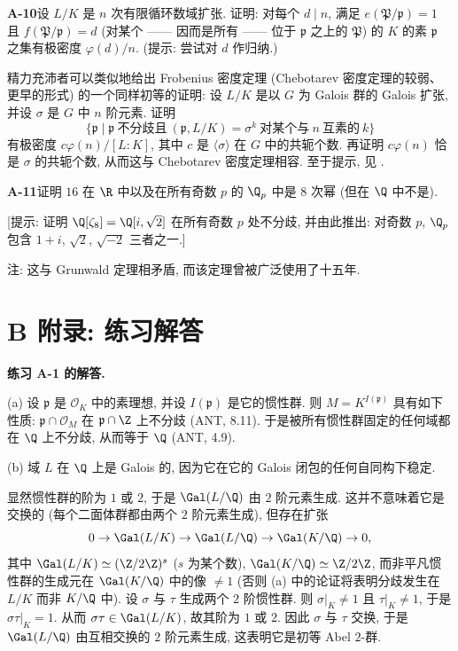 \medskip\noindent{}\hypertarget{item:viii.A-10}{}\textbf{A-10}\quad 设 $L/K$ 是 $n$ 次有限循环数域扩张. 证明: 对每个 $d\mid n$, 满足 $e(\mathfrak{P}/\mathfrak{p})=1$ 且 $f(\mathfrak{P}/\mathfrak{p})=d$ (对某个 —— 因而是所有 —— 位于 $\mathfrak{p}$ 之上的 $\mathfrak{P}$) 的 $K$ 的素 $\mathfrak{p}$ 之集有极密度 $\varphi(d)/n$. (提示: 尝试对 $d$ 作归纳.)

精力充沛者可以类似地给出 Frobenius 密度定理 (Chebotarev 密度定理的较弱、更早的形式) 的一个同样初等的证明: 设 $L/K$ 是以 $G$ 为 Galois 群的 Galois 扩张, 并设 $\sigma$ 是 $G$ 中 $n$ 阶元素. 证明
\[
\{\mathfrak{p}\mid \mathfrak{p}\ \text{不分歧且}\ (\mathfrak{p},L/K)=\sigma^{k}\ \text{对某个与}\ n\ \text{互素的}\ k\}
\]
有极密度 $c\varphi(n)/[L:K]$, 其中 $c$ 是 $\langle\sigma\rangle$ 在 $G$ 中的共轭个数. 再证明 $c\varphi(n)$ 恰是 $\sigma$ 的共轭个数, 从而这与 Chebotarev 密度定理相容. 至于提示, 见 \cite[pp.~207--208]{Marcus1977}.

\medskip\noindent\textbf{A-11}\quad 证明 $16$ 在 $\R$ 中以及在所有奇数 $p$ 的 $\Q_p$ 中是 $8$ 次幂 (但在 $\Q$ 中不是).

[提示: 证明 $\Q[\zeta_8]=\Q[i,\sqrt{2}]$ 在所有奇数 $p$ 处不分歧, 并由此推出: 对奇数 $p$, $\Q_p$ 包含 $1+i$, $\sqrt{2}$, $\sqrt{-2}$ 三者之一.]

注: 这与 Grunwald 定理相矛盾, 而该定理曾被广泛使用了十五年.

\cleardoublepage{}
\section*{B 附录: 练习解答}\label{sec:VIII.B}

\noindent\textbf{练习 A-1 的解答.}

(a) 设 $\mathfrak{p}$ 是 $\mathcal{O}_K$ 中的素理想, 并设 $I(\mathfrak{p})$ 是它的惯性群. 则 $M=K^{I(\mathfrak{p})}$ 具有如下性质: $\mathfrak{p}\cap\mathcal{O}_M$ 在 $\mathfrak{p}\cap\Z$ 上不分歧 (ANT, 8.11). 于是被所有惯性群固定的任何域都在 $\Q$ 上不分歧, 从而等于 $\Q$ (ANT, 4.9).

(b) 域 $L$ 在 $\Q$ 上是 Galois 的, 因为它在它的 Galois 闭包的任何自同构下稳定.

显然惯性群的阶为 $1$ 或 $2$, 于是 $\Gal(L/\Q)$ 由 $2$ 阶元素生成. 这并不意味着它是交换的 (每个二面体群都由两个 $2$ 阶元素生成), 但存在扩张
\[
0\to\Gal(L/K)\to\Gal(L/\Q)\to\Gal(K/\Q)\to 0,
\]
其中 $\Gal(L/K)\simeq(\Z/2\Z)^{s}$ ($s$ 为某个数), $\Gal(K/\Q)\simeq\Z/2\Z$, 而非平凡惯性群的生成元在 $\Gal(K/\Q)$ 中的像 $\ne 1$ (否则 (a) 中的论证将表明分歧发生在 $L/K$ 而非 $K/\Q$ 中). 设 $\sigma$ 与 $\tau$ 生成两个 $2$ 阶惯性群. 则 $\sigma|_K\ne1$ 且 $\tau|_K\ne1$, 于是 $\sigma\tau|_K=1$. 从而 $\sigma\tau\in\Gal(L/K)$, 故其阶为 $1$ 或 $2$. 因此 $\sigma$ 与 $\tau$ 交换, 于是 $\Gal(L/\Q)$ 由互相交换的 $2$ 阶元素生成, 这表明它是初等 Abel $2$-群.

